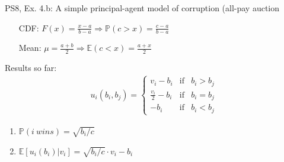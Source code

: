 \begin{frame}{PS8, Ex. 4.b: A simple principal-agent model of corruption (all-pay auction}
\begin{multicols}{2}
\begin{itemize}
        \item[CDF:] $F(x)=\frac{x-a}{b-a}\Rightarrow\mathbb{P}(c>x)=\frac{c-a}{b-a}$
        \item[Mean:] $\mu=\frac{a+b}{2}\Rightarrow\mathbb{E}(c<x)=\frac{a+x}{2}$
      \end{itemize}
      \vspace{-6pt}
      Results so far: \vspace{-6pt}
      \begin{align*}
        u_i(b_i,b_j)=\left\{\begin{array}{lcl}
          v_i-b_i           & \text{if} & b_i>b_j \\
          \frac{v_i}{2}-b_i & \text{if} & b_i=b_j \\
          -b_i              & \text{if} & b_i<b_j
        \end{array}\right.
      \end{align*} \vspace{-16pt}
      \begin{enumerate}
        \item $\mathbb{P}(i\ wins)=\sqrt{b_i/c}$
        \item $\mathbb{E}[u_i(b_i)|v_i]=\sqrt{b_i/c}\cdot v_i-b_i$
      \end{enumerate}
      \vfill\null
    \end{multicols}
\end{frame}
